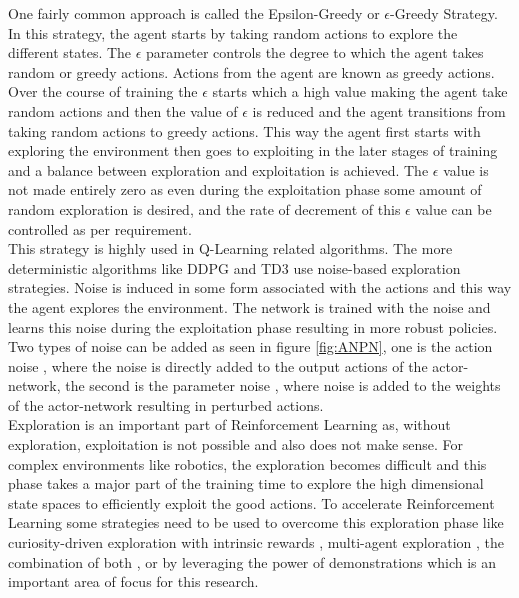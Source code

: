 One fairly common approach is called the Epsilon-Greedy or $\epsilon$-Greedy Strategy. In this strategy, the agent starts by taking random actions to explore the different states. The $\epsilon$ parameter controls the degree to which the agent takes random or greedy actions. Actions from the agent are known as greedy actions. Over the course of training the $\epsilon$ starts which a high value making the agent take random actions and then the value of $\epsilon$ is reduced and the agent transitions from taking random actions to greedy actions. This way the agent first starts with exploring the environment then goes to exploiting in the later stages of training and a balance between exploration and exploitation is achieved. The $\epsilon$ value is not made entirely zero as even during the exploitation phase some amount of random exploration is desired, and the rate of decrement of this $\epsilon$ value can be controlled as per requirement. \\

This strategy is highly used in Q-Learning related algorithms. The more deterministic algorithms like DDPG and TD3 use noise-based exploration strategies. Noise is induced in some form associated with the actions and this way the agent explores the environment. The network is trained with the noise and learns this noise during the exploitation phase resulting in more robust policies. Two types of noise can be added as seen in figure \ref{fig:ANPN}, one is the action noise \cite{lillicrap2019continuous} \cite{fujimoto2018addressing}, where the noise is directly added to the output actions of the actor-network, the second is the parameter noise \cite{plappert2018parameter}, where noise is added to the weights of the actor-network resulting in perturbed actions. \\

Exploration is an important part of Reinforcement Learning as, without exploration, exploitation is not possible and also does not make sense. For complex environments like robotics, the exploration becomes difficult and this phase takes a major part of the training time to explore the high dimensional state spaces to efficiently exploit the good actions. To accelerate Reinforcement Learning some strategies need to be used to overcome this exploration phase like curiosity-driven exploration with intrinsic rewards \cite{burda2018exploration}, multi-agent exploration \cite{lowe2020multiagent}, the combination of both \cite{lanier2019curiositydriven}, or by leveraging the power of demonstrations which is an important area of focus for this research. \\

